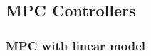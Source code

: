 \subsection{MPC Controllers}
\label{subsec:mpc_controllers}

\subsubsection{MPC with linear model}
\label{subsubsec:mpc_linear}